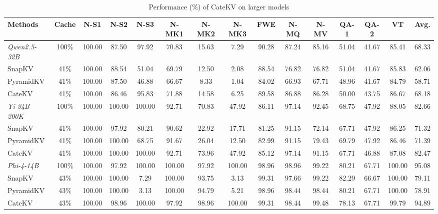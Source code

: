 \begin{table}[t]
\centering
\caption{Performance (\%) of CateKV on larger models}
\setlength{\tabcolsep}{3pt} %
\small

\begin{tabular}{l|c|cccccccccccc|c}
\toprule
Methods & Cache & N-S1 & N-S2 & N-S3 & N-MK1 & N-MK2 & N-MK3 & FWE & N-MQ & N-MV & QA-1 & QA-2 & VT & Avg. \\ 
\midrule
\textit{Qwen2.5-32B} & 100\% & 100.00 & 87.50 &	97.92 &	70.83 &	15.63 &	7.29 &	90.28 &	87.24 & 85.16 &	51.04 &	41.67 &	85.41 &	68.33 \\
SnapKV  & 41\% & 100.00 & 88.54 & 51.04 & 69.79 & 12.50 & 2.08 & 88.54 & 76.82 & 76.82 & 51.04 & 41.67 & 85.83 & 62.06 \\
PyramidKV  & 41\% & 100.00 & 87.50 & 46.88 & 66.67 & 8.33 &	1.04 &	84.02 &	66.93 &	67.71 &	48.96 &	41.67 &	84.79 &	58.71 \\
\rowcolor{cyan!10}
CateKV  & 41\% & 100.00 & 86.46 & 95.83 & 71.88 & 14.58 & 6.25 & 89.58 & 86.88 & 86.28 & 50.00 & 43.75 & 86.67 & 68.18 \\
\midrule
\textit{Yi-34B-200K} & 100\% & 100.00 & 100.00 & 100.00 & 92.71 & 70.83 & 47.92 & 86.11 & 97.14 & 92.45 & 68.75 & 47.92 & 88.05 & 82.66 \\
SnapKV & 41\% & 100.00 & 97.92 & 80.21 & 90.62 & 22.92 & 17.71 & 81.25 & 91.15 & 72.14 & 67.71 & 47.92 & 86.25 & 71.32 \\
PyramidKV & 41\% & 100.00 & 100.00 & 68.75 & 91.67 & 26.04 & 12.50 & 82.99 & 91.15 & 79.43 & 69.79 & 47.92 & 86.46 & 71.39 \\
\rowcolor{cyan!10}
CateKV & 41\% & 100.00 & 100.00 & 100.00 & 92.71 & 73.96 & 47.92 & 85.12 & 97.14 & 91.15 & 67.71 & 46.88 & 87.08 & 82.47 \\
\midrule
\textit{Phi-4-14B} & 100\% & 100.00 & 97.92 & 100.00 & 100.00 & 97.92 & 100.00 & 98.96 & 98.96 & 99.22 & 80.21 & 67.71 & 100.00 & 95.08 \\
SnapKV & 43\% & 100.00 & 100.00 & 7.29 & 100.00 & 93.75 & 3.13 & 99.31 & 97.66 & 99.22 & 82.29 & 66.67 & 100.00 & 79.11 \\
PyramidKV & 43\% & 100.00 & 100.00 & 3.13 & 100.00 & 94.79 & 5.21 & 98.96 & 98.44 & 98.44 & 80.21 & 67.71 & 100.00 & 78.91 \\
\rowcolor{cyan!10}
CateKV & 43\% & 100.00 & 98.96 & 100.00 & 97.92 & 98.96 & 100.00 & 99.31 & 98.44 & 99.48 & 78.13 & 67.71 & 99.79 & 94.89 \\
\bottomrule
\end{tabular}
\label{tab:larger_models}
\vspace{-0.3cm}
\end{table}
